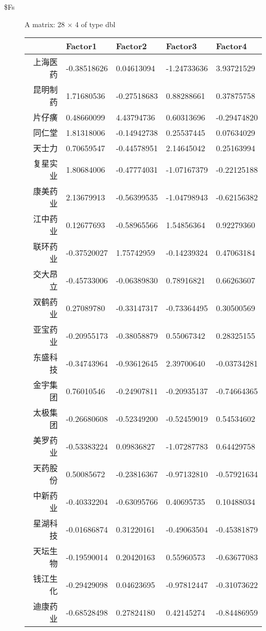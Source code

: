 \documentclass[UTF8,a4paper]{ctexart}
\begin{document}
    
    \begin{description}
\item[\$Fs] A matrix: 28 × 4 of type dbl
\begin{tabular}{r|llll}
  & Factor1 & Factor2 & Factor3 & Factor4\\
\hline
	上海医药 & -0.38518626 &  0.04613094 & -1.24733636 &  3.93721529\\
	昆明制药 &  1.71680536 & -0.27518683 &  0.88288661 &  0.37875758\\
	片仔癀 &  0.48660099 &  4.43794736 &  0.60313696 & -0.29474820\\
	同仁堂 &  1.81318006 & -0.14942738 &  0.25537445 &  0.07634029\\
	天士力 &  0.70659547 & -0.44578951 &  2.14645042 &  0.25163994\\
	复星实业 &  1.80684006 & -0.47774031 & -1.07167379 & -0.22125188\\
	康美药业 &  2.13679913 & -0.56399535 & -1.04798943 & -0.62156382\\
	江中药业 &  0.12677693 & -0.58965566 &  1.54856364 &  0.92279360\\
	联环药业 & -0.37520027 &  1.75742959 & -0.14239324 &  0.47063184\\
	交大昂立 & -0.45733006 & -0.06389830 &  0.78916821 &  0.66263607\\
	双鹤药业 &  0.27089780 & -0.33147317 & -0.73364495 &  0.30500569\\
	亚宝药业 & -0.20955173 & -0.38058879 &  0.55067342 &  0.28325155\\
	东盛科技 & -0.34743964 & -0.93612645 &  2.39700640 & -0.03734281\\
	金宇集团 &  0.76010546 & -0.24907811 & -0.20935137 & -0.74664365\\
	太极集团 & -0.26680608 & -0.52349200 & -0.52459019 &  0.54534602\\
	美罗药业 & -0.53383224 &  0.09836827 & -1.07287783 &  0.64429758\\
	天药股份 &  0.50085672 & -0.23816367 & -0.97132810 & -0.57921634\\
	中新药业 & -0.40332204 & -0.63095766 &  0.40695735 &  0.10488034\\
	星湖科技 & -0.01686874 &  0.31220161 & -0.49063504 & -0.45381879\\
	天坛生物 & -0.19590014 &  0.20420163 &  0.55960573 & -0.63677083\\
	钱江生化 & -0.29429098 &  0.04623695 & -0.97812447 & -0.31073622\\
	迪康药业 & -0.68528498 &  0.27824180 &  0.42145274 & -0.84486959\\

\end{tabular}
\end{description}
\end{document}
